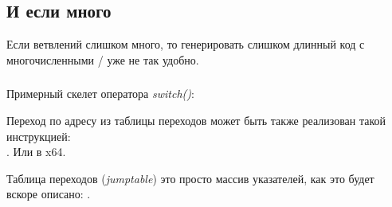 \subsection{И если много}

Если ветвлений слишком много, то генерировать слишком длинный код с многочисленными \JE/\JNE 
уже не так удобно.







\subsubsection{\Conclusion{}}

Примерный скелет оператора \emph{switch()}:



Переход по адресу из таблицы переходов может быть также реализован такой инструкцией: \\
. Или  в x64.

Таблица переходов (\emph{jumptable}) это просто массив указателей, как это будет вскоре описано: .
